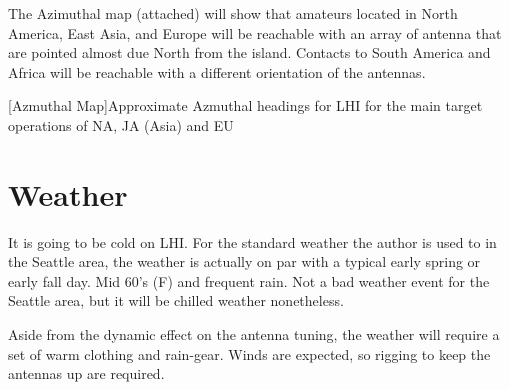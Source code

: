 \documentclass[11pt]{article}
\begin{document}
The Azimuthal map (attached) will show that amateurs located in North America,
East Asia, and Europe will be reachable with an array of antenna that are 
pointed almost due North from the island.  Contacts to South America and 
Africa will
be reachable with a different orientation of the antennas.

\vskip2mm
\noindent%
\begin{minipage}{\linewidth}%
\captionsetup{width=0.8\linewidth}
[Azmuthal Map]{Approximate Azmuthal headings for LHI
for the main target operations of NA, JA (Asia) and EU}
\label{azim}
\end{minipage}
\vskip3mm

\section{Weather}

It is going to be cold on LHI.  For the standard weather
the author is used to in the Seattle area, the weather is actually
on par with a typical early spring or early fall day.  Mid 60's (F)
and frequent rain.  Not a bad weather event for the Seattle area,
but it will be chilled weather nonetheless. 
\par
Aside from the dynamic effect on the antenna tuning, the weather
will require a set of warm clothing and rain-gear.  Winds are 
expected, so rigging to keep the antennas up are required.
\end{document}
